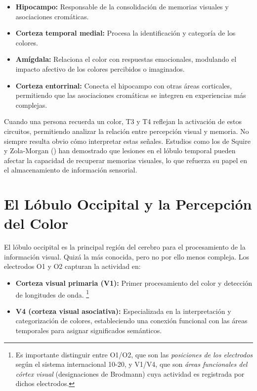 \begin{itemize}
    \item \textbf{Hipocampo:} Responsable de la consolidación de memorias visuales y asociaciones cromáticas.
    \item \textbf{Corteza temporal medial:} Procesa la identificación y categoría de los colores.
    \item \textbf{Amígdala:} Relaciona el color con respuestas emocionales, modulando el impacto afectivo de los colores percibidos o imaginados.
    \item \textbf{Corteza entorrinal:} Conecta el hipocampo con otras áreas corticales, permitiendo que las asociaciones cromáticas se integren en experiencias más complejas.
\end{itemize}

Cuando una persona recuerda un color, T3 y T4 reflejan la activación de estos circuitos, permitiendo analizar la relación entre percepción visual y memoria. No siempre resulta obvio cómo interpretar estas señales. Estudios como los de Squire y Zola-Morgan (\citeyear{Squire_Zola_Morgan_1991}) han demostrado que lesiones en el lóbulo temporal pueden afectar la capacidad de recuperar memorias visuales, lo que refuerza su papel en el almacenamiento de información sensorial.

\section{El Lóbulo Occipital y la Percepción del Color}

El lóbulo occipital es la principal región del cerebro para el procesamiento de la información visual. Quizá la más conocida, pero no por ello menos compleja. Los electrodos O1 y O2 capturan la actividad en:

\begin{itemize}
    \item \textbf{Corteza visual primaria (V1):} Primer procesamiento del color y detección de longitudes de onda. \footnote{Es importante distinguir entre O1/O2, que son las \textit{posiciones de los electrodos} según el sistema internacional 10-20, y V1/V4, que son \textit{áreas funcionales del córtex visual} (designaciones de Brodmann) cuya actividad es registrada por dichos electrodos.}
    
    \item \textbf{V4 (corteza visual asociativa):} Especializada en la interpretación y categorización de colores, estableciendo una conexión funcional con las áreas temporales para asignar significados semánticos.
\end{itemize}

